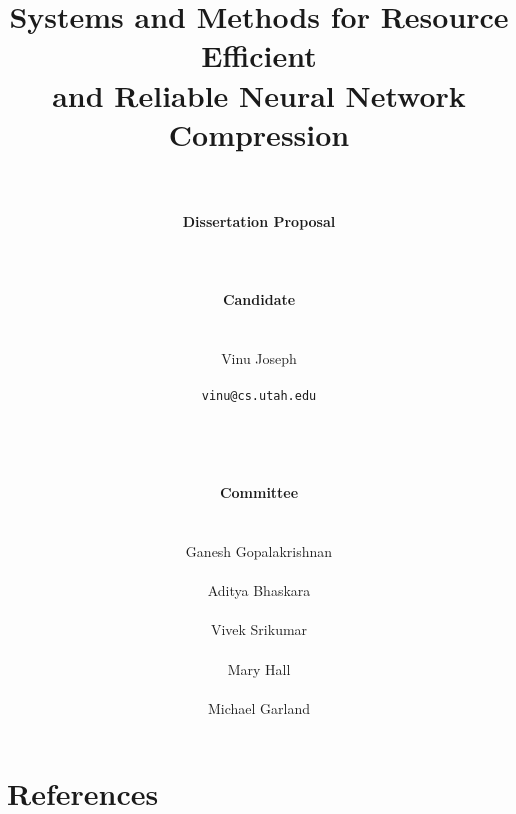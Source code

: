 \documentclass[10pt, oneside]{article}
\title{\huge \textbf{Systems and Methods for Resource Efficient \\ and Reliable Neural Network Compression}}
\author{\\
        \\\huge \textbf{Dissertation Proposal} \\
        \\
        \\
        \\\huge \textbf{Candidate} \\
        \\
        \\\huge Vinu Joseph \\
        \\ \LARGE \texttt{vinu@cs.utah.edu}
        \\
        \\
        \\
        \\
        \\\huge \textbf{Committee}\\
        \\
        \\\huge Ganesh Gopalakrishnan \\
        \\\huge Aditya Bhaskara \\
        \\\huge Vivek Srikumar \\
        \\\huge Mary Hall \\
        \\\huge Michael Garland \\
        
        }
\date{}
\begin{document}
\maketitle
\newpage
\setcounter{tocdepth}{3}
\tableofcontents
\newpage






\renewcommand\refname{\vskip -1cm}
\section{References}

\printbibliography
\end{document}

